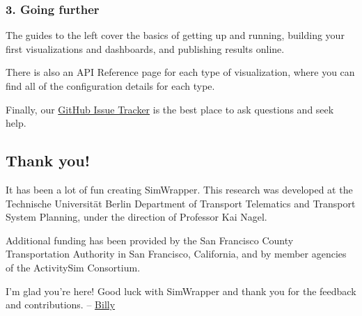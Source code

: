 \hypertarget{going-further}{%
\subsubsection{3. Going further}\label{going-further}}

The guides to the left cover the basics of getting up and running,
building your first visualizations and dashboards, and publishing
results online.

There is also an API Reference page for each type of visualization,
where you can find all of the configuration details for each type.

Finally, our
\href{https://github.com/simwrapper/simwrapper/issues}{GitHub Issue
Tracker} is the best place to ask questions and seek help.

\hypertarget{thank-you}{%
\subsection{Thank you!}\label{thank-you}}

It has been a lot of fun creating SimWrapper. This research was
developed at the Technische Universität Berlin Department of Transport
Telematics and Transport System Planning, under the direction of
Professor Kai Nagel.

Additional funding has been provided by the San Francisco County
Transportation Authority in San Francisco, California, and by member
agencies of the ActivitySim Consortium.

I'm glad you're here! Good luck with SimWrapper and thank you for the
feedback and contributions. -- \href{https://billyc.github.io/}{Billy}
